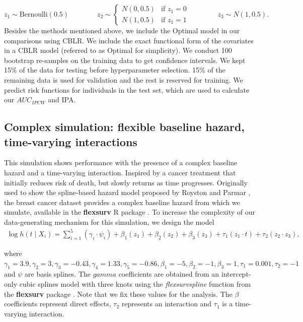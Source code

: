 \documentclass[APA,LATO1COL]{WileyNJD-v2}
\begin{document}
\[
z_{1} \sim \textrm{Bernoulli}(0.5) \qquad \qquad %
z_{2} \sim \begin{cases}
 N(0,0.5) & \textrm{if } z_{1}=0\\ 
 N(1,0.5) & \textrm{if } z_{1}=1
\end{cases} \qquad \qquad
z_{3} \sim N(1,0.5).
\]
Besides the methods mentioned above, we include the Optimal model in our comparisons using CBLR.
We include the exact functional form of the covariates in a CBLR model (referred to as Optimal for simplicity).
We conduct 100 bootstrap re-samples on the training data to get confidence intervals. We kept 15\% of the
data for testing before hyperparameter selection. 15\% of the remaining data is used for validation and the rest is reserved
for training. We predict risk functions for individuals in the test set, which are used to calculate our $AUC_{IPCW}$ and IPA. 





\hypertarget{complex-simulation-flexible-baseline-hazard-time-varying-interactions}{%
\subsection{Complex simulation: flexible baseline hazard, time-varying
interactions}\label{complex-simulation-flexible-baseline-hazard-time-varying-interactions}}

This simulation shows performance with the presence of a complex
baseline hazard and a time-varying interaction. Inspired by a cancer treatment
that initially reduces risk of death, but slowly returns as time progresses. 
Originally used to show the spline-based hazard model proposed by Royston and Parmar
\citep{royston2002flexible}, the breast cancer dataset provides a
complex baseline hazard from which we simulate, available in the
\textbf{flexsurv} R package \citep{flexsurv}. To increase the complexity
of our data-generating mechanism for this simulation, we design the
model \begin{align}
\log h(t \mid X_i) =\sum_{i=1}^{5} (\gamma_{i} \cdot \psi_{i}) + \beta_{{1}} (z_{1}) + \beta_{{2}} (z_{2})+ \beta_{{3}} (z_{3})+ \tau_{1} ( z_{1} \cdot t)+ \tau_{2} (z_{2} \cdot z_{3}), \nonumber
\end{align}




where
\(\gamma_{1}=3.9, \gamma_{2}=3, \gamma_{3}=-0.43, \gamma_{4}=1.33,\gamma_{5}=-0.86, \beta_{{1}}=-5, \beta_{{2}}=-1, \beta_{{3}}=1, \tau_{1}=0.001, \tau_{2}=-1\)
and \(\psi\) are basis splines. The \(gamma\) coefficients are obtained
from an intercept-only cubic splines model with three knots using the
\emph{flexsurvspline} function from the \textbf{flexsurv} package
\citep{flexsurv}. Note that we fix these values for the analysis. The
\(\beta\) coefficients represent direct effects, \(\tau_{2}\) represents
an interaction and \(\tau_{1}\) is a time-varying
interaction.
\end{document}
